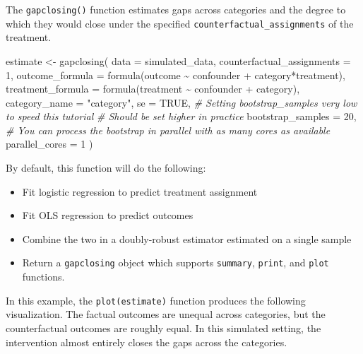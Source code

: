 \documentclass[
]{article}
\newenvironment{Shaded}{\begin{snugshade}}{\end{snugshade}}
\newcommand{\AttributeTok}[1]{\textcolor[rgb]{0.77,0.63,0.00}{#1}}
\newcommand{\CommentTok}[1]{\textcolor[rgb]{0.56,0.35,0.01}{\textit{#1}}}
\newcommand{\ConstantTok}[1]{\textcolor[rgb]{0.00,0.00,0.00}{#1}}
\newcommand{\DecValTok}[1]{\textcolor[rgb]{0.00,0.00,0.81}{#1}}
\newcommand{\FunctionTok}[1]{\textcolor[rgb]{0.00,0.00,0.00}{#1}}
\newcommand{\NormalTok}[1]{#1}
\newcommand{\OtherTok}[1]{\textcolor[rgb]{0.56,0.35,0.01}{#1}}
\newcommand{\SpecialCharTok}[1]{\textcolor[rgb]{0.00,0.00,0.00}{#1}}
\newcommand{\StringTok}[1]{\textcolor[rgb]{0.31,0.60,0.02}{#1}}
\providecommand{\tightlist}{%
  \setlength{\itemsep}{0pt}\setlength{\parskip}{0pt}}
\begin{document}
The \texttt{gapclosing()} function estimates gaps across categories and the degree to which they would close under the specified \texttt{counterfactual\_assignments} of the treatment.

\begin{Shaded}
\begin{Highlighting}[]
\NormalTok{estimate }\OtherTok{\textless{}{-}} \FunctionTok{gapclosing}\NormalTok{(}
  \AttributeTok{data =}\NormalTok{ simulated\_data,}
  \AttributeTok{counterfactual\_assignments =} \DecValTok{1}\NormalTok{,}
  \AttributeTok{outcome\_formula =} \FunctionTok{formula}\NormalTok{(outcome }\SpecialCharTok{\textasciitilde{}}\NormalTok{ confounder }\SpecialCharTok{+}\NormalTok{ category}\SpecialCharTok{*}\NormalTok{treatment),}
  \AttributeTok{treatment\_formula =} \FunctionTok{formula}\NormalTok{(treatment }\SpecialCharTok{\textasciitilde{}}\NormalTok{ confounder }\SpecialCharTok{+}\NormalTok{ category),}
  \AttributeTok{category\_name =} \StringTok{"category"}\NormalTok{,}
  \AttributeTok{se =} \ConstantTok{TRUE}\NormalTok{,}
  \CommentTok{\# Setting bootstrap\_samples very low to speed this tutorial}
  \CommentTok{\# Should be set higher in practice}
  \AttributeTok{bootstrap\_samples =} \DecValTok{20}\NormalTok{,}
  \CommentTok{\# You can process the bootstrap in parallel with as many cores as available}
  \AttributeTok{parallel\_cores =} \DecValTok{1}
\NormalTok{)}
\end{Highlighting}
\end{Shaded}

By default, this function will do the following:

\begin{itemize}
\tightlist
\item
  Fit logistic regression to predict treatment assignment
\item
  Fit OLS regression to predict outcomes
\item
  Combine the two in a doubly-robust estimator estimated on a single sample
\item
  Return a \texttt{gapclosing} object which supports \texttt{summary}, \texttt{print}, and \texttt{plot} functions.
\end{itemize}

In this example, the \texttt{plot(estimate)} function produces the following visualization. The factual outcomes are unequal across categories, but the counterfactual outcomes are roughly equal. In this simulated setting, the intervention almost entirely closes the gaps across the categories.
\end{document}
